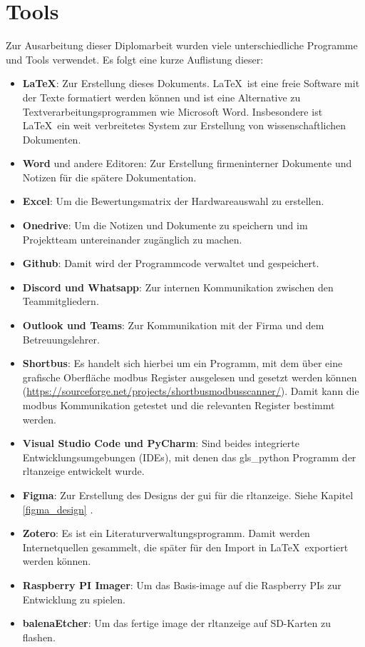 \ifoot{\leftmark}
\chapter{Tools}
\noindent Zur Ausarbeitung dieser Diplomarbeit wurden viele unterschiedliche Programme und Tools verwendet. Es folgt eine kurze Auflistung dieser:
\begin{itemize}
	\item \textbf{\LaTeX}: Zur Erstellung dieses Dokuments. \LaTeX \ ist eine freie Software mit der Texte formatiert werden können und ist eine Alternative zu Textverarbeitungsprogrammen wie Microsoft Word. Insbesondere ist \LaTeX \ ein weit verbreitetes System zur Erstellung von wissenschaftlichen Dokumenten. \cite[vgl.][]{latex_o.J.}
	\item \textbf{Word} und andere Editoren: Zur Erstellung firmeninterner Dokumente und Notizen für die spätere Dokumentation.
	\item \textbf{Excel}: Um die Bewertungsmatrix der Hardwareauswahl zu erstellen.
	\item \textbf{Onedrive}: Um die Notizen und Dokumente zu speichern und im Projektteam untereinander zugänglich zu machen.
	\item \textbf{Github}: Damit wird der Programmcode verwaltet und gespeichert.
	\item \textbf{Discord und Whatsapp}: Zur internen Kommunikation zwischen den Teammitgliedern.
	\item \textbf{Outlook und Teams}: Zur Kommunikation mit der Firma und dem Betreuungslehrer.
	\item \textbf{Shortbus}: Es handelt sich hierbei um ein Programm, mit dem über eine grafische Oberfläche \gls{modbus} Register ausgelesen und gesetzt werden können (\url{https://sourceforge.net/projects/shortbusmodbusscanner/}). Damit kann die \gls{modbus} Kommunikation getestet und die relevanten Register bestimmt werden.
	\item \textbf{Visual Studio Code und PyCharm}: Sind beides integrierte Entwicklungsumgebungen (IDEs), mit denen das \gls{gls_python} Programm der \ac{rltanzeige} entwickelt wurde.
	\item \textbf{Figma}: Zur Erstellung des Designs \bzw der \ac{gui} für die \ac{rltanzeige}. Siehe Kapitel \ref{figma_design} .
	\item \textbf{Zotero}: Es ist ein Literaturverwaltungsprogramm. Damit werden Internetquellen gesammelt, die später für den Import in \LaTeX \ exportiert werden können.
    \item \textbf{Raspberry PI Imager}: Um das Basis-\gls{image} auf die Raspberry PIs zur Entwicklung zu spielen.
    \item \textbf{balenaEtcher}: Um das fertige \gls{image} der \ac{rltanzeige} auf SD-Karten zu flashen.
\end{itemize}
